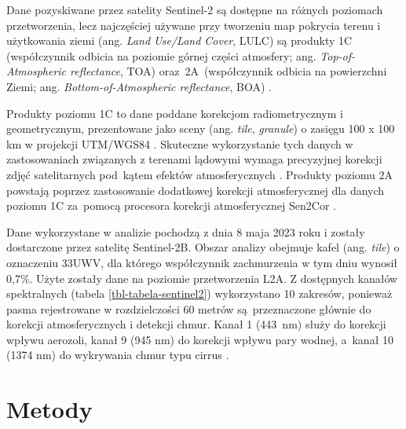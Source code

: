 \documentclass{amuthesis}
\begin{document}
Dane pozyskiwane przez satelity Sentinel-2 są dostępne na różnych
poziomach przetworzenia, lecz najczęściej używane przy tworzeniu map
pokrycia terenu i użytkowania ziemi (ang. \emph{Land Use/Land Cover},
LULC) są produkty 1C (współczynnik odbicia na poziomie górnej części
atmosfery; ang. \emph{Top-of-Atmospheric reflectance}, TOA)
oraz~2A~(współczynnik odbicia na powierzchni Ziemi; ang.
\emph{Bottom-of-Atmospheric reflectance}, BOA)
\autocite{phiri_2020_sentinel2}.

Produkty poziomu 1C to dane poddane korekcjom radiometrycznym i
geometrycznym, prezentowane jako sceny (ang. \emph{tile},
\emph{granule}) o zasięgu 100 x 100 km w projekcji UTM/WGS84
\autocite{esa_2015_sentinel2handbook}. Skuteczne wykorzystanie tych
danych w zastosowaniach związanych z terenami lądowymi wymaga
precyzyjnej korekcji zdjęć satelitarnych pod~kątem efektów
atmosferycznych \autocite{main-knorn_2017_Sen2Cor}. Produkty poziomu 2A
powstają poprzez zastosowanie dodatkowej korekcji atmosferycznej dla
danych poziomu 1C za~pomocą procesora korekcji atmosferycznej Sen2Cor
\autocite{main-knorn_2017_Sen2Cor}.

Dane wykorzystane w analizie pochodzą z dnia 8 maja 2023 roku i zostały
dostarczone przez satelitę Sentinel-2B. Obszar analizy obejmuje kafel
(ang. \emph{tile}) o oznaczeniu 33UWV, dla którego współczynnik
zachmurzenia w tym dniu wynosił 0,7\%. Użyte zostały dane na poziomie
przetworzenia L2A. Z dostępnych kanałów spektralnych (tabela
\ref{tbl-tabela-sentinel2}) wykorzystano 10 zakresów, ponieważ pasma
rejestrowane w rozdzielczości 60 metrów są~przeznaczone głównie do
korekcji atmosferycznych i detekcji chmur. Kanał 1 (443~nm) służy do
korekcji wpływu aerozoli, kanał 9 (945 nm) do korekcji wpływu pary
wodnej, a~kanał 10 (1374 nm) do wykrywania chmur typu cirrus
\autocite{drusch_2012_sen2GMES}.


\hypertarget{sec-metody}{%
\chapter{Metody}\label{sec-metody}}
\end{document}
